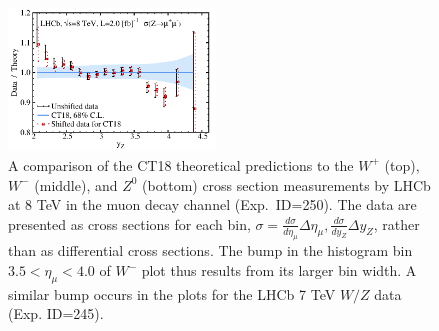 \begin{figure}[tbp]
	\includegraphics[width=0.49\textwidth]{./fig/data_250_CT18__3_DoT_ect.pdf}
	\caption{A comparison of the CT18 theoretical predictions to the $W^+$ (top), $W^-$ (middle), and $Z^0$ (bottom) cross section measurements by LHCb at 8 TeV in the muon decay channel (Exp.~ID=250). The data are presented as cross sections for each bin, $\sigma=\frac{d\sigma}{d\eta_\mu}\Delta\eta_\mu,\frac{d\sigma}{dy_Z}\Delta y_Z$, rather than as differential cross sections.
	The bump in the histogram bin $3.5<\eta_\mu<4.0$ of $W^-$ plot thus results from its larger bin width. A similar bump occurs in the plots for the LHCb 7 TeV $W/Z$ data (Exp. ID=245).
			\label{fig:id250}
}
\end{figure}

